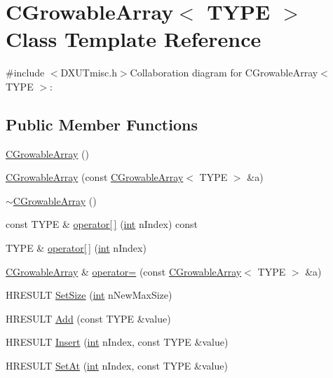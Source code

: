 \hypertarget{class_c_growable_array}{
\section{CGrowableArray$<$ TYPE $>$ Class Template Reference}
\label{class_c_growable_array}
}


{\ttfamily \#include $<$DXUTmisc.h$>$}Collaboration diagram for CGrowableArray$<$ TYPE $>$:\subsection*{Public Member Functions}
\begin{DoxyCompactItemize}
\item 
\hyperlink{class_c_growable_array_ae4c4775ac90e12f7aa54d04e7e21237d}{CGrowableArray} ()
\item 
\hyperlink{class_c_growable_array_a1182f9c2f07df66d2a91933a5cf96940}{CGrowableArray} (const \hyperlink{class_c_growable_array}{CGrowableArray}$<$ TYPE $>$ \&a)
\item 
\hyperlink{class_c_growable_array_a74c6b972a37b4541d31bbd78bb005061}{$\sim$CGrowableArray} ()
\item 
const TYPE \& \hyperlink{class_c_growable_array_a8250879c57e65000a7ac62644432e292}{operator\mbox{[}$\,$\mbox{]}} (\hyperlink{_d_x_u_tgui_8cpp_a2d77ed03302b6978834ee3b6f57837fb}{int} nIndex) const 
\item 
TYPE \& \hyperlink{class_c_growable_array_a03c07cc22ff5856f83633a58f37e64b9}{operator\mbox{[}$\,$\mbox{]}} (\hyperlink{_d_x_u_tgui_8cpp_a2d77ed03302b6978834ee3b6f57837fb}{int} nIndex)
\item 
\hyperlink{class_c_growable_array}{CGrowableArray} \& \hyperlink{class_c_growable_array_add2653ca7201a0500ba21d4783990552}{operator=} (const \hyperlink{class_c_growable_array}{CGrowableArray}$<$ TYPE $>$ \&a)
\item 
HRESULT \hyperlink{class_c_growable_array_a4a4ebbbb825519349a1cb07a8002975a}{SetSize} (\hyperlink{_d_x_u_tgui_8cpp_a2d77ed03302b6978834ee3b6f57837fb}{int} nNewMaxSize)
\item 
HRESULT \hyperlink{class_c_growable_array_a63527f5abc32e76867278928eee2e32b}{Add} (const TYPE \&value)
\item 
HRESULT \hyperlink{class_c_growable_array_a163c27cde9aff49764ef63c4a784ffce}{Insert} (\hyperlink{_d_x_u_tgui_8cpp_a2d77ed03302b6978834ee3b6f57837fb}{int} nIndex, const TYPE \&value)
\item 
HRESULT \hyperlink{class_c_growable_array_ac8768c8a2f9183af4f3f24d98f4818e1}{SetAt} (\hyperlink{_d_x_u_tgui_8cpp_a2d77ed03302b6978834ee3b6f57837fb}{int} nIndex, const TYPE \&value)

\end{DoxyCompactItemize}
